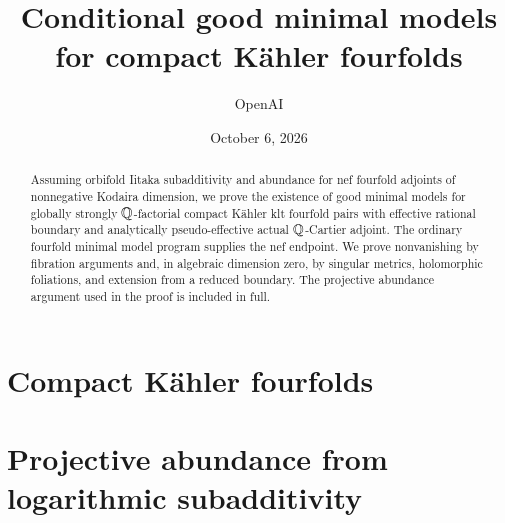 \documentclass[11pt,letterpaper]{article}
\title{Conditional good minimal models\\for compact K\"ahler fourfolds}
\author{OpenAI}
\date{October 6, 2026}
\begin{document}
\maketitle
\begin{abstract}
Assuming orbifold Iitaka subadditivity and abundance for nef fourfold adjoints
of nonnegative Kodaira dimension, we prove the existence of good minimal
models for globally strongly \(\mathbb{Q}\)-factorial compact K\"ahler klt
fourfold pairs with effective rational boundary and analytically
pseudo-effective actual \(\mathbb{Q}\)-Cartier adjoint. The ordinary fourfold
minimal model program supplies the nef endpoint. We prove nonvanishing by
fibration arguments and, in algebraic dimension zero, by singular
metrics, holomorphic foliations, and extension from a reduced boundary.
The projective abundance argument used in the proof is included in full.
\end{abstract}
\tableofcontents
\newpage
\part{Compact K\"ahler fourfolds}









\clearpage
\appendix
\part{Projective abundance from logarithmic subadditivity}









\clearpage
{}
{}


\end{document}
